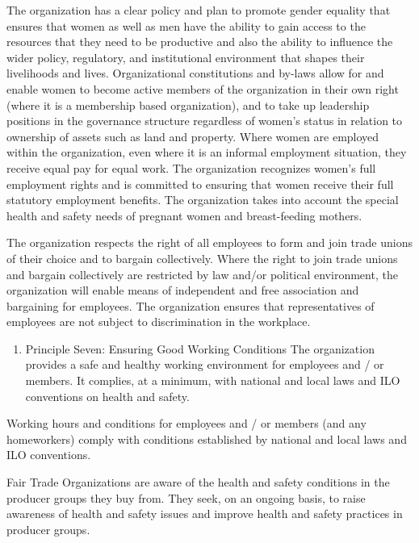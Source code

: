 \documentclass[]{book}
\providecommand{\tightlist}{%
  \setlength{\itemsep}{0pt}\setlength{\parskip}{0pt}}
\begin{document}
The organization has a clear policy and plan to promote gender equality that ensures that women as well as men have the ability to gain access to the resources that they need to be productive and also the ability to influence the wider policy, regulatory, and institutional environment that shapes their livelihoods and lives. Organizational constitutions and by-laws allow for and enable women to become active members of the organization in their own right (where it is a membership based organization), and to take up leadership positions in the governance structure regardless of women's status in relation to ownership of assets such as land and property. Where women are employed within the organization, even where it is an informal employment situation, they receive equal pay for equal work. The organization recognizes women's full employment rights and is committed to ensuring that women receive their full statutory employment benefits. The organization takes into account the special health and safety needs of pregnant women and breast-feeding mothers.

The organization respects the right of all employees to form and join trade unions of their choice and to bargain collectively. Where the right to join trade unions and bargain collectively are restricted by law and/or political environment, the organization will enable means of independent and free association and bargaining for employees. The organization ensures that representatives of employees are not subject to discrimination in the workplace.

\begin{enumerate}
\def\labelenumi{\arabic{enumi}.}
\setcounter{enumi}{6}
\tightlist
\item
  Principle Seven: Ensuring Good Working Conditions
  The organization provides a safe and healthy working environment for employees and / or members. It complies, at a minimum, with national and local laws and ILO conventions on health and safety.
\end{enumerate}

Working hours and conditions for employees and / or members (and any homeworkers) comply with conditions established by national and local laws and ILO conventions.

Fair Trade Organizations are aware of the health and safety conditions in the producer groups they buy from. They seek, on an ongoing basis, to raise awareness of health and safety issues and improve health and safety practices in producer groups.
\end{document}
